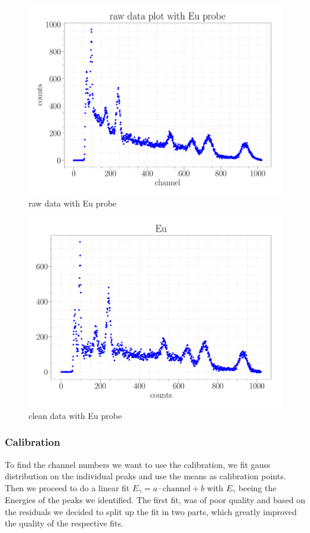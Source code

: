 \documentclass[a4paper,12pt]{article}
\begin{document}
\begin{figure}
\center
\includegraphics[scale=0.3]{../Figures/Eu_raw.pdf}
\caption{raw data with Eu probe}
\label{Eu_raw}
\end{figure}

\begin{figure}
\center
\includegraphics[scale=0.3]{../Figures/Eu.pdf}
\caption{clean data with Eu probe}
\label{Eu}
\end{figure}

\subsubsection{Calibration}
To find the channel numbers we want to use the calibration, we fit gauss distribution on the individual peaks and use the means as calibration points.
Then we proceed to do a linear fit $E_{\gamma} = a \cdot \mathrm{channel}+ b$ with $E_{\gamma}$ beeing the Energies of the peaks we identified.
The first fit, was of poor quality and based on the residuals we decided to split up the fit in two parts, which greatly improved the quality of the respective fits.
\end{document}
